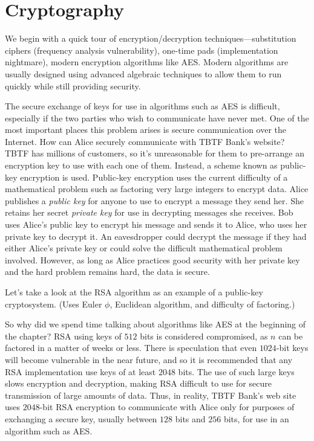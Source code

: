 \chapter{Cryptography}\label{ch:crypto}

We begin with a quick tour of encryption/decryption
techniques---substitution ciphers (frequency analysis vulnerability),
one-time pads (implementation nightmare), modern encryption algorithms
like AES. Modern algorithms are usually designed using advanced
algebraic techniques to allow them to run quickly while still
providing security.

The secure exchange of keys for use in algorithms such as AES is
difficult, especially if the two parties who wish to communicate have
never met. One of the most important places this problem arises is
secure communication over the Internet. How can Alice securely
communicate with TBTF Bank's website? TBTF has millions of customers,
so it's unreasonable for them to pre-arrange an encryption key to use
with each one of them. Instead, a scheme known as public-key
encryption is used. Public-key encryption uses the current difficulty
of a mathematical problem such as factoring very large integers to
encrypt data. Alice publishes a \emph{public key} for anyone to use to
encrypt a message they send her. She retains her secret \emph{private
  key} for use in decrypting messages she receives. Bob uses Alice's
public key to encrypt his message and sends it to Alice, who uses her
private key to decrypt it. An eavesdropper could decrypt the message
if they had either Alice's private key or could solve the difficult
mathematical problem involved. However, as long as Alice practices
good security with her private key and the hard problem remains hard,
the data is secure.

Let's take a look at the RSA algorithm as an example of a public-key
cryptosystem. (Uses Euler $\phi$, Euclidean algorithm, and difficulty
of factoring.)

So why did we spend time talking about algorithms like AES at the
beginning of the chapter? RSA using keys of $512$ bits is considered
compromised, as $n$ can be factored in a matter of weeks or
less. There is speculation that even $1024$-bit keys will become
vulnerable in the near future, and so it is recommended that any RSA
implementation use keys of at least $2048$ bits. The use of such large
keys slows encryption and decryption, making RSA difficult to use for
secure transmission of large amounts of data. Thus, in reality, TBTF
Bank's web site uses $2048$-bit RSA encryption to communicate with
Alice only for purposes of exchanging a secure key, usually between
$128$ bits and $256$ bits, for use in an algorithm such as AES.

